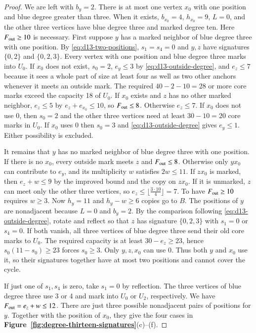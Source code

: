 \documentclass[preprint,11pt,numbers]{elsarticle-arxiv}
\numberwithin{equation}{section}
\theoremstyle{definition}
\begin{document}
\begin{proof}
We are left with $b_y=2$. There is at most one vertex $x_0$ with
one position and blue degree greater than three. When it exists,
$b_{x_0}=4$, $h_{x_0}=9$, $L=0$, and the other three vertices have
blue degree three and marked degree ten. Here $F_{\rm out}\ge10$
is necessary. First suppose $y$ has a marked neighbor of blue degree
three with one position. By \eqref{eq:d13-two-positions}, $s_1=s_4=0$
and $y,z$ have
signatures $\{0,2\}$ and $\{0,2,3\}$. Every vertex with one position
and blue degree three marks into $U_0$. If $x_0$ does not exist,
$s_0=2$, $e_y\le3$ by \eqref{eq:d13-outside-degree}, and
$e_z\le7$ because it sees a whole part of size at least four as
well as two other anchors whenever it meets an outside mark.
The required $40-2-10=28$ or more core marks exceed the capacity
18 of $U_0$. If $x_0$ exists and $z$ has no other marked neighbor,
$e_z\le5$ by $e_z+e_{x_0}\le10$, so $F_{\rm out}\le8$.
Otherwise $e_z\le7$. If $x_0$ does not use 0, then $s_0=2$ and
the other three vertices need at least $30-10=20$ core marks in
$U_0$. If $x_0$ uses 0 then $s_0=3$ and
\eqref{eq:d13-outside-degree} gives $e_y\le1$. Either possibility
is excluded.

It remains that $y$ has no marked neighbor of blue degree three
with one position. If there is no $x_0$, every outside mark meets
$z$ and $F_{\rm out}\le8$. Otherwise only $yx_0$ can contribute
to $e_y$, and its multiplicity $w$ satisfies $2w\le11$. If $zx_0$
is marked, then $e_z+w\le9$ by the improved bound and the copy on
$zx_0$. If it is unmarked, $z$ can meet only the other three vertices,
so $e_z\le\lfloor\frac{3\cdot10}{4}\rfloor=7$. To have $F_{\rm out}\ge10$
requires $w\ge3$. Now $h_y=11$ and $h_y-w\ge6$ copies go to $B$.
The positions of $y$ are nonadjacent because $L=0$ and $b_y=2$.
By the comparison following \eqref{eq:d13-outside-degree}, rotate
and reflect so that $z$ has signature $\{0,2,3\}$ with
$s_1=0$ or $s_4=0$. If both vanish, all three vertices of blue
degree three send their old core marks to $U_0$. The required
capacity is at least $30-e_z\ge23$, hence $s_0(11-s_0)\ge23$
forces $s_0\ge3$. Only $y,z,x_0$ can use 0. Thus both $y$ and
$x_0$ use it, so their signatures together have at most two positions
and cannot cover the cycle.

If just one of $s_1,s_4$ is zero, take $s_1=0$ by reflection.
The three vertices of blue degree three use 3 or 4 and mark into
$U_0$ or $U_2$, respectively. We have $F_{\rm out}=e_z+w\le12$.
There are just three possible nonadjacent pairs of positions for $y$.
Together with the position of $x_0$, they give the four cases in
\textbf{Figure~\ref{fig:degree-thirteen-signatures}}(c)--(f).


\end{proof}
\end{document}
